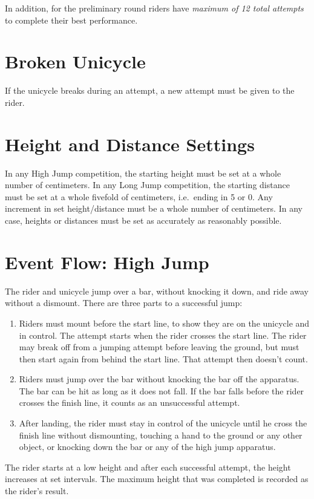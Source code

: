 In addition, for the preliminary round riders have \textit{maximum of 12 total attempts} to complete their best performance.

\section{Broken Unicycle}
If the unicycle breaks during an attempt, a new attempt must be given to the rider.

\section{Height and Distance Settings}

In any High Jump competition, the starting height must be set at a whole number of centimeters.
In any Long Jump competition, the starting distance must be set at a whole fivefold of centimeters, i.e.\ ending in 5 or 0.
Any increment in set height/distance must be a whole number of centimeters.
In any case, heights or distances must be set as accurately as reasonably possible.

\section{Event Flow: High Jump}
The rider and unicycle jump over a bar, without knocking it down, and ride away without a dismount.
There are three parts to a successful jump:
\begin{enumerate}
\item Riders must mount before the start line, to show they are on the unicycle and in control.
The attempt starts when the rider crosses the start line.
The rider may break off from a jumping attempt before leaving the ground, but must then start again from behind the start line.
That attempt then doesn't count.
\item Riders must jump over the bar without knocking the bar off the apparatus.
The bar can be hit as long as it does not fall.
If the bar falls before the rider crosses the finish line, it counts as an unsuccessful attempt.
\item After landing, the rider must stay in control of the unicycle until he cross the finish line without dismounting, touching a hand to the ground or any other object, or knocking down the bar or any of the high jump apparatus.
\end{enumerate}
The rider starts at a low height and after each successful attempt, the height increases at set intervals.
The maximum height that was completed is recorded as the rider's result.


